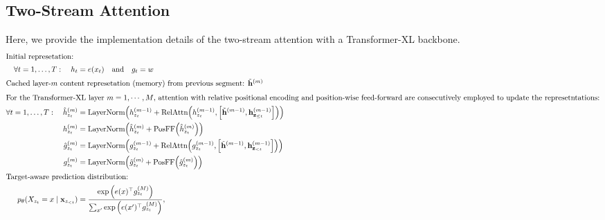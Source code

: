 

\subsection{Two-Stream Attention}
\label{sec:two-stream-detail}
Here, we provide the implementation details of the two-stream attention with a Transformer-XL backbone.
\begin{align*}
\intertext{Initial represetation:}
\forall t = 1, \dots, T: \quad h_t &= e(x_t) \quad\text{and}\quad g_t = w \\
\intertext{Cached layer-$m$ content represetation (memory) from previous segment: $\tilde{\rvh}^{(m)}$}
\intertext{For the Transformer-XL layer $m = 1, \cdots, M$, attention with relative positional encoding and position-wise feed-forward are consecutively employed to update the represetntations:} 
\forall t = 1, \dots, T: \quad 
\hat{h}_{z_t}^{(m)} &= \text{LayerNorm}\rbr{ h_{z_t}^{(m-1)} + 
	\text{RelAttn} \rbr{ 
		h_{z_t}^{(m-1)}, 
		\sbr{\tilde{\rvh}^{(m-1)}, \rvh_{\rvz_{\leq t}}^{(m-1)}} } } \\
h_{z_t}^{(m)} &= \text{LayerNorm}\rbr{ \hat{h}_{z_t}^{(m)} + 
	\text{PosFF} \rbr{  \hat{h}_{z_t}^{(m)} } } \\
\hat{g}_{z_t}^{(m)} &= \text{LayerNorm}\rbr{ g_{z_t}^{(m-1)} + 
	\text{RelAttn}\rbr{ 
		g_{z_t}^{(m-1)}, 
		\sbr{\tilde{\rvh}^{(m-1)}, \rvh_{\rvz_{< t}}^{(m-1)}} } } \\
g_{z_t}^{(m)} &= \text{LayerNorm}\rbr{ \hat{g}_{z_t}^{(m)} + 
	\text{PosFF} \rbr{  \hat{g}_{z_t}^{(m)} } } \\
\intertext{Target-aware prediction distribution:}
p_\theta(X_{z_t} = x \mid \rvx_{z_{<t}})
	&= \frac{\expo{ e(x)^\top g_{z_t}^{(M)} }}{\sum_{x'} \expo{ e(x')^\top g_{z_t}^{(M)} }},
\end{align*}

